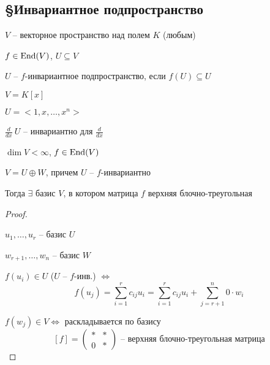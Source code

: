 
    \subsection*{\S Инвариантное подпространство}

    \par $V$ -- векторное пространство над полем $K$ (любым)
    \par $f \in \operatorname{End}(V)$, $U \subseteq V$

    \begin{definition}
        $U$ -- $f$-инвариантное подпространство, если $f(U) \subseteq U$
    \end{definition}

    \begin{illustration*}
        $V = K[x]$
        \par $U = <1, x, \dots, x^n>$
        \par $\frac{d}{dx} \ U$ -- инвариантно для $\frac{d}{dx}$
    \end{illustration*}

    \begin{theorem}
        $\dim V < \infty$, $f \in \operatorname{End}(V)$
        \par $V = U \oplus W$, причем $U$ -- $f$-инвариантно
        \par Тогда $\exists$ базис $V$, в котором матрица $f$ верхняя блочно-треугольная
    \end{theorem}

    \begin{proof}
        $ $
        \par $u_1, \dots, u_r$ -- базис $U$
        \par $w_{r+1}, \dots, w_n$ -- базис $W$
        \par $f(u_i) \in U$ \quad ($U$ -- $f$-инв.) $\Leftrightarrow$
        \[
            f(u_j) = \sum_{i=1}^r c_{ij}u_i = \sum_{i=1}^r c_{ij} u_i + \sum_{j=r+1}^n 0 \cdot w_i   
        \]
        \par $f(w_j) \in V \Leftrightarrow$ раскладывается по базису
        \[
            [f] = \begin{pmatrix}
                \boxed{*} & * \\
                0 & *
            \end{pmatrix} \text{ -- верхняя блочно-треугольная матрица}
        \]
    \end{proof}

